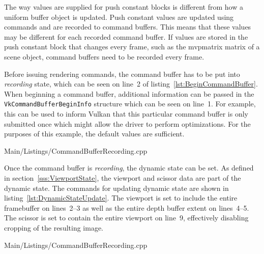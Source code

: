     The way values are supplied for push constant blocks is different from how a uniform buffer object is updated.
    Push constant values are updated using commands and are recorded to command buffers.
    This means that these values may be different for each recorded command buffer.
    If values are stored in the push constant block that changes every frame, such as the \gls{mvpmatrix} matrix of a scene object, command buffers need to be recorded every frame.


      Before issuing rendering commands, the command buffer has to be put into \textit{recording} state, which can be seen on line~2 of listing~\ref{lst:BeginCommandBuffer}.
      When beginning a command buffer, additional information can be passed in the \lstinline{VkCommandBufferBeginInfo} structure which can be seen on line~1.
      For example, this can be used to inform Vulkan that this particular command buffer is only submitted once which might allow the \gls{driver} to perform optimizations.
      For the purposes of this example, the default values are sufficient.

      
      {Main/Listings/CommandBufferRecording.cpp}

      Once the command buffer is \textit{recording}, the dynamic state can be set.
      As defined in section~\ref{sss:ViewportState}, the viewport and scissor data are part of the dynamic state.
      The commands for updating dynamic state are shown in listing~\ref{lst:DynamicStateUpdate}.
      The viewport is set to include the entire framebuffer on lines~2--3 as well as the entire depth buffer extent on lines~4--5.
      The scissor is set to contain the entire viewport on line~9, effectively disabling cropping of the resulting image.

      
      {Main/Listings/CommandBufferRecording.cpp}

